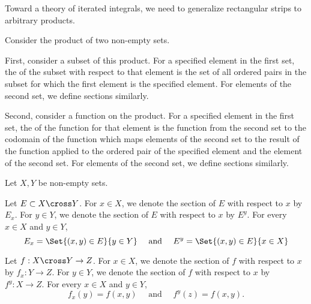 
\sbasic



\sstart



Toward a theory
of iterated integrals,
we need to generalize
rectangular strips to
arbitrary products.


Consider the
product of two
non-empty sets.

First, consider a subset
of this product.
For a specified element
in the first set,
the 
of the subset
with respect to
that element is
the set of all ordered pairs
in the subset for which the
first element is the specified element.
For elements of the second set,
we define sections similarly.

Second, consider a function
on the product.
For a specified element
in the first set,
the 
of the function for that
element is the function
from the second set to
the codomain of the function
which maps elements of
the second set to the result
of the function applied
to the ordered pair of
the specified element
and the element of the second set.
For elements of the second set,
we define sections similarly.


Let $X,Y$ be non-empty sets.

Let $E \subset X \cross Y$.
For $x \in X$,
we denote the section
of $E$ with respect to $x$
by $E_x$.
For $y \in Y$,
we denote the section
of $E$ with respect to $x$
by $E^y$.
For every $x \in X$ and
$y \in Y$,
\[
  E_x = \Set{(x,y) \in E}{y \in Y}
  \quad \text{ and } \quad
  E^y = \Set{(x,y) \in E}{x \in X}
\]

Let $f: X \cross Y \to Z$.
For $x \in X$,
we denote the section
of $f$ with respect to $x$
by $f_x: Y \to Z$.
For $y \in Y$,
we denote the section
of $f$ with respect to $x$
by $f^y: X \to Z$.
For every $x \in X$ and
$y \in Y$,
\[
  f_x(y) = f(x, y)
  \quad \text{ and } \quad
  f^y(z) = f(x, y).
\]


\strats
